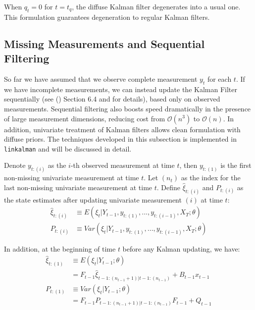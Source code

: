 \documentclass[10pt, titlepage]{article}
\numberwithin{equation}{section}
\begin{document}
When $q_{t}=0$ for $t=t_q$, the diffuse Kalman filter degenerates into a usual one. This formulation guarantees degeneration to regular Kalman filters.

\subsection{Missing Measurements and Sequential Filtering} \label{subsec:seq_filter}
So far we have assumed that we observe complete measurement $y_t$ for each $t$. If we have incomplete measurements, we can instead update the Kalman Filter sequentially (see (\cite{durbin_koopman_2001}) Section 6.4 and \cite{durbin_koopman_2000} for details), based only on observed measurements. Sequential filtering also boosts speed dramatically in the presence of large measurement dimensions, reducing cost from $\mathcal{O}(n^3)$ to $\mathcal{O}(n)$. In addition, univariate treatment of Kalman filters allows clean formulation with diffuse priors. The techniques developed in this subsection is implemented in \texttt{linkalman} and will be discussed in detail. 

Denote $y_{t:(i)}$ as the $i$-th observed measurement at time $t$, then $y_{t:(1)}$ is the first non-missing univariate measurement at time $t$. Let $(n_t)$ as the index for the last non-missing univariate measurement at time $t$. Define $\hat{\xi}_{t:(i)}$ and $P_{t:(i)}$ as the state estimates after updating univariate measurement $(i)$ at time $t$:
\begin{align*}
    \hat{\xi}_{t:(i)} &\equiv E(\xi_t|Y_{t-1},y_{t:(1)},...,y_{t:(i-1)},X_T;\theta) \\
    P_{t:(i)} &\equiv Var(\xi_t|Y_{t-1},y_{t:(1)},...,y_{t:(i-1)},X_T;\theta) 
\end{align*}

In addition, at the beginning of time $t$ before any Kalman updating, we have:
\begin{align}
    \hat{\xi}_{t:(1)} &\equiv E(\xi_{t}|Y_{t-1};\theta)\nonumber \\
    &= F_{t-1}\hat{\xi}_{t-1:(n_{t-1}+1)|t-1:(n_{t-1})}+B_{t-1}x_{t-1} \label{eq:diff_xi_seq0} \\
    P_{t:(1)} &\equiv Var(\xi_{t}|Y_{t-1};\theta) \nonumber \\
    &= F_{t-1}P_{t-1:(n_{t-1}+1)|t-1:(n_{t-1})}F_{t-1} + Q_{t-1} \label{eq:diff_P_seq0}
\end{align}
\end{document}
